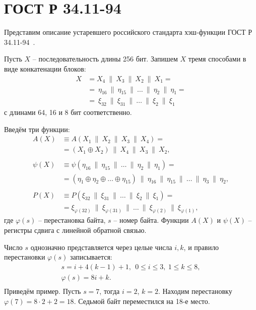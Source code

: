 \section{ГОСТ Р 34.11-94}

Представим описание устаревшего российского стандарта хэш-функции ГОСТ Р 34.11-94~\cite{GOST-94}.

Пусть $X$ -- последовательность длины 256 бит. Запишем $X$ тремя способами в виде конкатенации блоков:
\[ \begin{array}{ll}
    X & = X_4 ~\|~ X_3 ~\|~ X_2 ~\|~ X_1 = \\
    & = ~ \eta_{16} ~\|~ \eta_{15} ~\|~ \dots ~\|~ \eta_2 ~\|~ \eta_1 = \\
    & = ~ \xi_{32} ~\|~ \xi_{31} ~\|~ \dots ~\|~ \xi_2 ~\|~ \xi_1
\end{array} \]
с длинами 64, 16 и 8 бит соответственно.

Введём три функции:
\[ \begin{array}{ll}
    A(X) & \equiv A(X_1 ~\|~ X_2 ~\|~ X_3 ~\|~ X_4) = \\
        & = \left( X_1 \oplus X_2 \right) ~\|~ X_4 ~\|~ X_3 ~\|~ X_2, \\
    & \\
    \psi(X) & \equiv \psi(\eta_{16} ~\|~ \eta_{15} ~\|~ \dots ~\|~ \eta_2 ~\|~ \eta_1) = \\
        & = \left( \eta_1 \oplus \eta_2 \oplus \dots \oplus \eta_{15} \right) ~\|~
            \eta_{16} ~\|~ \eta_{15} ~\|~ \dots ~\|~ \eta_3 ~\|~ \eta_2, \\
    & \\
    P(X) & \equiv P(\xi_{32} ~\|~ \xi_{31} ~\|~ \dots ~\|~ \xi_2 ~\|~ \xi_1) = \\
        & = \xi_{\varphi(32)} ~\|~ \xi_{\varphi(31)} ~\|~ \dots ~\|~ \xi_{\varphi(2)} ~\|~ \xi_{\varphi(1)},
\end{array} \]
где $\varphi(s)$ -- перестановка байта, $s$ -- номер байта. Функции $A(X)$ и $\psi(X)$ -- регистры сдвига с линейной обратной связью.

Число $s$ однозначно представляется через целые числа $i,k$, и правило перестановки $\varphi(s)$ записывается:
\[ \begin{array}{c}
    s = i + 4 (k - 1) + 1, ~~ 0 \leq i \leq 3, ~ 1 \leq k \leq 8, \\
    \varphi(s) = 8 i + k. \\
\end{array} \]
Приведём пример. Пусть $s = 7$, тогда $i=2$, $k=2$. Находим перестановку $\varphi(7) = 8 \cdot 2 + 2 = 18$. Седьмой байт переместился на 18-е место.

